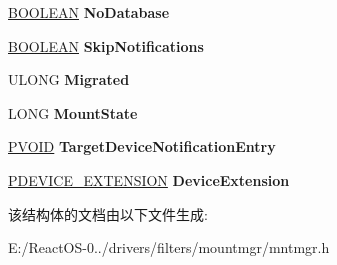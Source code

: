 \begin{DoxyCompactItemize}
\hyperlink{_processor_bind_8h_a112e3146cb38b6ee95e64d85842e380a}{B\+O\+O\+L\+E\+AN} {\bfseries No\+Database}
\item 
\mbox{\label{struct___d_e_v_i_c_e___i_n_f_o_r_m_a_t_i_o_n_aa0d640b07b1bd65431856cb6bc133ae7}} 
\hyperlink{_processor_bind_8h_a112e3146cb38b6ee95e64d85842e380a}{B\+O\+O\+L\+E\+AN} {\bfseries Skip\+Notifications}
\item 
\mbox{\label{struct___d_e_v_i_c_e___i_n_f_o_r_m_a_t_i_o_n_a502667786f4d7bd2c08e0faa949a8a0f}} 
U\+L\+O\+NG {\bfseries Migrated}
\item 
\mbox{\label{struct___d_e_v_i_c_e___i_n_f_o_r_m_a_t_i_o_n_a129c571d209acffe67c5afd6fe50f1c6}} 
L\+O\+NG {\bfseries Mount\+State}
\item 
\mbox{\label{struct___d_e_v_i_c_e___i_n_f_o_r_m_a_t_i_o_n_a1b28041387a96850fff0bf8a9e565805}} 
\hyperlink{interfacevoid}{P\+V\+O\+ID} {\bfseries Target\+Device\+Notification\+Entry}
\item 
\mbox{\label{struct___d_e_v_i_c_e___i_n_f_o_r_m_a_t_i_o_n_a2cb493890887e2373a15f69f62f6eb1b}} 
\hyperlink{struct___b_e_e_p___d_e_v_i_c_e___e_x_t_e_n_s_i_o_n}{P\+D\+E\+V\+I\+C\+E\+\_\+\+E\+X\+T\+E\+N\+S\+I\+ON} {\bfseries Device\+Extension}
\end{DoxyCompactItemize}


该结构体的文档由以下文件生成\+:\begin{DoxyCompactItemize}
\item 
E\+:/\+React\+O\+S-\/0../drivers/filters/mountmgr/mntmgr.\+h\end{DoxyCompactItemize}
